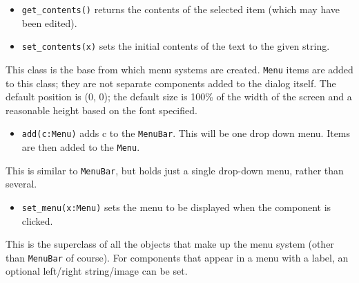 \begin{itemize}
\item\noindent\texttt{get\_contents()} returns the contents of the selected item (which may
have been edited).

\item\noindent\texttt{set\_contents(x)} sets the initial contents of the text to the given
string.
\end{itemize}

\medskip{}

This class is the base from which menu systems are created.  \texttt{Menu} items
are added to this class; they are not separate components added to the
dialog itself. The default position is (0, 0); the default size is
100\% of the width of the screen and a reasonable height based on the
font specified.

\begin{itemize}
\item\noindent\texttt{add(c:Menu)} adds c to the  \texttt{MenuBar}. This will be one
drop down menu. Items are then added to the  \texttt{Menu}.
\end{itemize}

\medskip{}

This is similar to  \texttt{MenuBar}, but holds just a single drop-down menu,
rather than several.

\begin{itemize}
\item\noindent\texttt{set\_menu(x:Menu)} sets the menu to be displayed
when the component is clicked.
\end{itemize}

\medskip{}

This is the superclass of all the objects that make up the menu system
(other than  \texttt{MenuBar} of course). For components that appear in a menu
with a label, an optional left/right string/image can be set.

